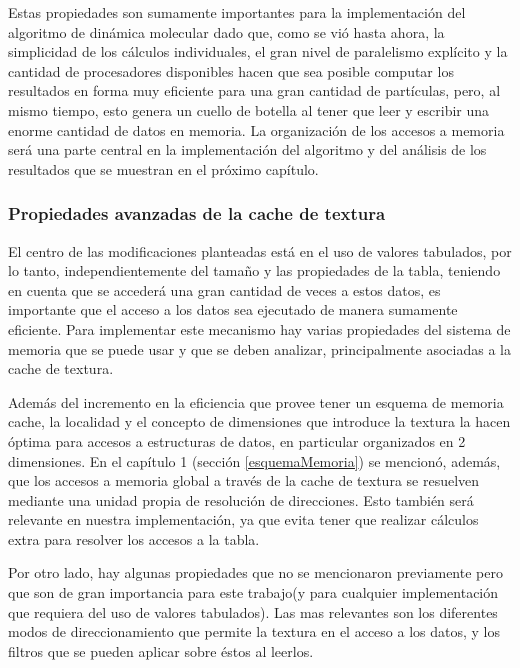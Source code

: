 Estas propiedades son sumamente importantes para la implementación del algoritmo de dinámica molecular dado que, como se vió hasta ahora, la simplicidad de los cálculos individuales, el gran nivel de paralelismo explícito y 
la cantidad de procesadores disponibles hacen que sea posible computar los resultados en forma muy eficiente para una gran cantidad de partículas, pero, al mismo tiempo, esto genera un cuello de botella al tener que leer y 
escribir una enorme cantidad de datos en memoria. La organización de los accesos a memoria será una parte central en la implementación del algoritmo y del análisis de los resultados que se muestran en el próximo capítulo.

\subsubsection{Propiedades avanzadas de la cache de textura} \label{texturaDetallado}

El centro de las modificaciones planteadas está en el uso de valores tabulados, por lo tanto, independientemente del tamaño y las propiedades de la tabla, teniendo en cuenta que se accederá una gran cantidad de veces a estos datos, 
es importante que el acceso a los datos sea ejecutado de manera sumamente eficiente.
Para implementar este mecanismo hay varias propiedades del sistema de memoria que se puede usar y que se deben analizar, principalmente asociadas a la cache de textura. 

Además del incremento en la eficiencia que provee tener un esquema de memoria cache, la localidad y el concepto de dimensiones que introduce la textura la hacen óptima para accesos a estructuras de datos, 
en particular organizados en 2 dimensiones. En el capítulo 1 (sección \ref{esquemaMemoria}) se mencionó, además, que los accesos a memoria global a través de la cache de textura se resuelven mediante una unidad propia de resoluci\'on de direcciones. 
Esto también será relevante en nuestra implementación, ya que evita tener que realizar cálculos extra para resolver los accesos a la tabla.

Por otro lado, hay algunas propiedades que no se mencionaron previamente pero que son de gran importancia para este trabajo(y para cualquier implementación que requiera del uso de valores tabulados). 
Las mas relevantes son los diferentes modos de direccionamiento que permite la textura en el acceso a los datos, y los filtros que se pueden aplicar sobre éstos al leerlos. 

